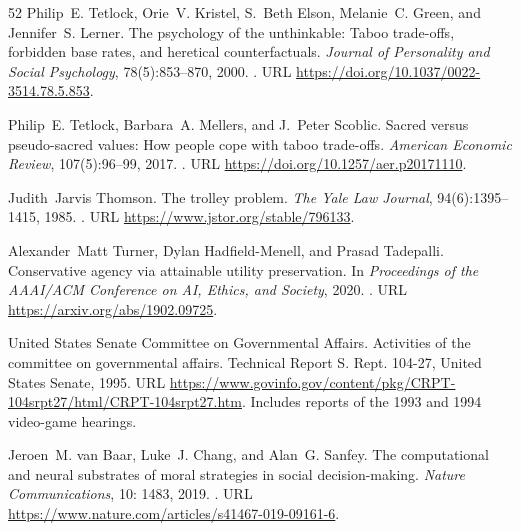 \documentclass[11pt,a4paper]{article}
\theoremstyle{remark}
\begin{document}
\begin{thebibliography}{52}
Philip~E. Tetlock, Orie~V. Kristel, S.~Beth Elson, Melanie~C. Green, and Jennifer~S. Lerner.
\newblock The psychology of the unthinkable: Taboo trade-offs, forbidden base rates, and heretical counterfactuals.
\newblock \emph{Journal of Personality and Social Psychology}, 78(5):853--870, 2000.
\newblock {}.
\newblock URL \url{https://doi.org/10.1037/0022-3514.78.5.853}.

Philip~E. Tetlock, Barbara~A. Mellers, and J.~Peter Scoblic.
\newblock Sacred versus pseudo-sacred values: How people cope with taboo trade-offs.
\newblock \emph{American Economic Review}, 107(5):96--99, 2017.
\newblock {}.
\newblock URL \url{https://doi.org/10.1257/aer.p20171110}.

Judith~Jarvis Thomson.
\newblock The trolley problem.
\newblock \emph{The Yale Law Journal}, 94(6):1395--1415, 1985.
\newblock {}.
\newblock URL \url{https://www.jstor.org/stable/796133}.

Alexander~Matt Turner, Dylan Hadfield-Menell, and Prasad Tadepalli.
\newblock Conservative agency via attainable utility preservation.
\newblock In \emph{Proceedings of the AAAI/ACM Conference on AI, Ethics, and
  Society}, 2020.
\newblock {}.
\newblock URL \url{https://arxiv.org/abs/1902.09725}.

{United States Senate Committee on Governmental Affairs}.
\newblock Activities of the committee on governmental affairs.
\newblock Technical Report S. Rept. 104-27, United States Senate, 1995.
\newblock URL
  \url{https://www.govinfo.gov/content/pkg/CRPT-104srpt27/html/CRPT-104srpt27.htm}.
\newblock Includes reports of the 1993 and 1994 video-game hearings.

Jeroen~M. van Baar, Luke~J. Chang, and Alan~G. Sanfey.
\newblock The computational and neural substrates of moral strategies in social
  decision-making.
\newblock \emph{Nature Communications}, 10: 1483, 2019.
\newblock {}.
\newblock URL \url{https://www.nature.com/articles/s41467-019-09161-6}.


\end{thebibliography}
\end{document}
